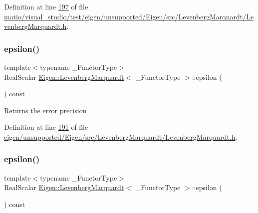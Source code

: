 Definition at line \hyperlink{matio_2visual__studio_2test_2eigen_2unsupported_2_eigen_2src_2_levenberg_marquardt_2_levenberg_marquardt_8h_source_l00197}{197} of file \hyperlink{matio_2visual__studio_2test_2eigen_2unsupported_2_eigen_2src_2_levenberg_marquardt_2_levenberg_marquardt_8h_source}{matio/visual\+\_\+studio/test/eigen/unsupported/\+Eigen/src/\+Levenberg\+Marquardt/\+Levenberg\+Marquardt.\+h}.

\mbox{\label{class_eigen_1_1_levenberg_marquardt_aac799068926ca0bc3387b2dc5c0eb113}} 
\subsubsection{\texorpdfstring{epsilon()}{epsilon()}\hspace{0.1cm}{\footnotesize\ttfamily [1/2]}}
{\footnotesize\ttfamily template$<$typename \+\_\+\+Functor\+Type$>$ \\
Real\+Scalar \hyperlink{class_eigen_1_1_levenberg_marquardt}{Eigen\+::\+Levenberg\+Marquardt}$<$ \+\_\+\+Functor\+Type $>$\+::epsilon (\begin{DoxyParamCaption}{ }\end{DoxyParamCaption}) const\hspace{0.3cm}{\ttfamily [inline]}}

\begin{DoxyReturn}{Returns}
the error precision 
\end{DoxyReturn}


Definition at line \hyperlink{eigen_2unsupported_2_eigen_2src_2_levenberg_marquardt_2_levenberg_marquardt_8h_source_l00191}{191} of file \hyperlink{eigen_2unsupported_2_eigen_2src_2_levenberg_marquardt_2_levenberg_marquardt_8h_source}{eigen/unsupported/\+Eigen/src/\+Levenberg\+Marquardt/\+Levenberg\+Marquardt.\+h}.

\mbox{\label{class_eigen_1_1_levenberg_marquardt_aac799068926ca0bc3387b2dc5c0eb113}} 
\subsubsection{\texorpdfstring{epsilon()}{epsilon()}\hspace{0.1cm}{\footnotesize\ttfamily [2/2]}}
{\footnotesize\ttfamily template$<$typename \+\_\+\+Functor\+Type$>$ \\
Real\+Scalar \hyperlink{class_eigen_1_1_levenberg_marquardt}{Eigen\+::\+Levenberg\+Marquardt}$<$ \+\_\+\+Functor\+Type $>$\+::epsilon (\begin{DoxyParamCaption}{ }\end{DoxyParamCaption}) const\hspace{0.3cm}{\ttfamily [inline]}}

